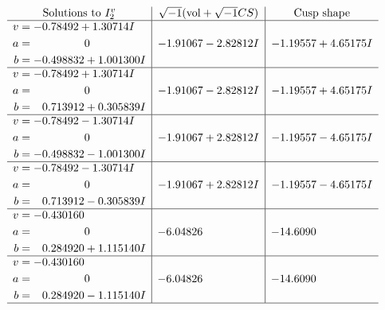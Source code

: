 \documentclass[1p]{elsarticle_modified}
\theoremstyle{definition}
\newcommand{\I}{\sqrt{-1}}
\begin{document}
$$\begin{array}{c|c|c}  
\text{Solutions to }I^v_{2}& \I (\text{vol} + \sqrt{-1}CS) & \text{Cusp shape}\\
 \hline 
\begin{aligned}
v &= -0.78492 + 1.30714 I \\
a &= \phantom{-0.000000 } 0 \\
b &= -0.498832 + 1.001300 I\end{aligned}
 & -1.91067 - 2.82812 I & -1.19557 + 4.65175 I \\ \hline\begin{aligned}
v &= -0.78492 + 1.30714 I \\
a &= \phantom{-0.000000 } 0 \\
b &= \phantom{-}0.713912 + 0.305839 I\end{aligned}
 & -1.91067 - 2.82812 I & -1.19557 + 4.65175 I \\ \hline\begin{aligned}
v &= -0.78492 - 1.30714 I \\
a &= \phantom{-0.000000 } 0 \\
b &= -0.498832 - 1.001300 I\end{aligned}
 & -1.91067 + 2.82812 I & -1.19557 - 4.65175 I \\ \hline\begin{aligned}
v &= -0.78492 - 1.30714 I \\
a &= \phantom{-0.000000 } 0 \\
b &= \phantom{-}0.713912 - 0.305839 I\end{aligned}
 & -1.91067 + 2.82812 I & -1.19557 - 4.65175 I \\ \hline\begin{aligned}
v &= -0.430160\phantom{ +0.000000I} \\
a &= \phantom{-0.000000 } 0 \\
b &= \phantom{-}0.284920 + 1.115140 I\end{aligned}
 & -6.04826\phantom{ +0.000000I} & -14.6090\phantom{ +0.000000I} \\ \hline\begin{aligned}
v &= -0.430160\phantom{ +0.000000I} \\
a &= \phantom{-0.000000 } 0 \\
b &= \phantom{-}0.284920 - 1.115140 I\end{aligned}
 & -6.04826\phantom{ +0.000000I} & -14.6090\phantom{ +0.000000I}\\
 \hline 
 \end{array}$$\newpage
\newpage\renewcommand{\arraystretch}{1}
\end{document}
